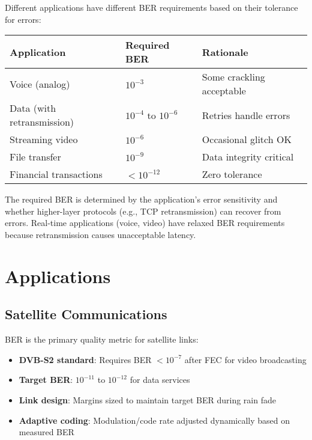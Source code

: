 Different applications have different BER requirements based on their tolerance for errors:

\begin{center}
\begin{tabular}{@{}lll@{}}
\toprule
Application & Required BER & Rationale \\
\midrule
Voice (analog) & $10^{-3}$ & Some crackling acceptable \\
Data (with retransmission) & $10^{-4}$ to $10^{-6}$ & Retries handle errors \\
Streaming video & $10^{-6}$ & Occasional glitch OK \\
File transfer & $10^{-9}$ & Data integrity critical \\
Financial transactions & $< 10^{-12}$ & Zero tolerance \\
\bottomrule
\end{tabular}
\end{center}

\begin{keyconcept}
The required BER is determined by the application's error sensitivity and whether higher-layer protocols (e.g., TCP retransmission) can recover from errors. Real-time applications (voice, video) have relaxed BER requirements because retransmission causes unacceptable latency.
\end{keyconcept}

\section{Applications}

\subsection{Satellite Communications}

BER is the primary quality metric for satellite links:
\begin{itemize}
\item \textbf{DVB-S2 standard}: Requires BER $< 10^{-7}$ after FEC for video broadcasting
\item \textbf{Target BER}: $10^{-11}$ to $10^{-12}$ for data services
\item \textbf{Link design}: Margins sized to maintain target BER during rain fade
\item \textbf{Adaptive coding}: Modulation/code rate adjusted dynamically based on measured BER
\end{itemize}

